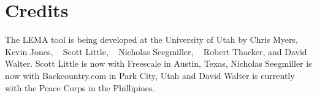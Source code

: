\documentclass[titlepage,11pt]{article}
\begin{document}
\section{Credits}

\noindent
The LEMA tool is being developed at the University of Utah
by 
Chris Myers,
~
Kevin Jones,
~
Scott Little,
~
Nicholas Seegmiller,
~
Robert Thacker,
and
David Walter.
Scott Little is now with Freescale in Austin, Texas, Nicholas Seegmiller is now
with Backcountry.com in Park City, Utah and David Walter is currently with the
Peace Corps in the Phillipines.
  
\end{document}
